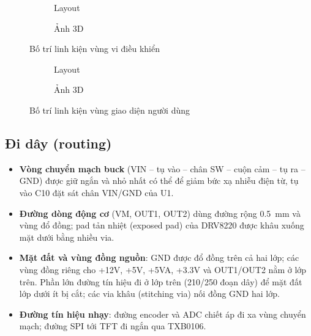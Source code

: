 \begin{figure}[H]
\centering
\begin{subfigure}{0.49\linewidth}\centering{}\caption{Layout}\end{subfigure}
\hfill
\begin{subfigure}{0.49\linewidth}\centering{}\caption{Ảnh 3D}\end{subfigure}
\caption{Bố trí linh kiện vùng vi điều khiển}
\label{fig:place_mcu}
\end{figure}

\begin{figure}[H]
\centering
\begin{subfigure}{0.65\linewidth}\centering{}\caption{Layout}\end{subfigure}

\vspace{0.5em}
\begin{subfigure}{0.65\linewidth}\centering{}\caption{Ảnh 3D}\end{subfigure}
\caption{Bố trí linh kiện vùng giao diện người dùng}
\label{fig:place_ui}
\end{figure}

\subsection{Đi dây (routing)}
\begin{itemize}
  \item \textbf{Vòng chuyển mạch buck} (VIN -- tụ vào -- chân SW -- cuộn cảm -- tụ ra -- GND) được giữ ngắn và nhỏ nhất có thể để giảm bức xạ nhiễu điện từ, tụ vào C10 đặt sát chân VIN/GND của U1.
  \item \textbf{Đường dòng động cơ} (VM, OUT1, OUT2) dùng đường rộng \SI{0.5}{\milli\metre} và vùng đổ đồng; pad tản nhiệt (exposed pad) của DRV8220 được khâu xuống mặt dưới bằng nhiều via.
  \item \textbf{Mặt đất và vùng đồng nguồn}: GND được đổ đồng trên cả hai lớp; các vùng đồng riêng cho +12V, +5V, +5VA, +3.3V và OUT1/OUT2 nằm ở lớp trên. Phần lớn đường tín hiệu đi ở lớp trên (210/250 đoạn dây) để mặt đất lớp dưới ít bị cắt; các via khâu (stitching via) nối đồng GND hai lớp.
  \item \textbf{Đường tín hiệu nhạy}: đường encoder và ADC chiết áp đi xa vùng chuyển mạch; đường SPI tới TFT đi ngắn qua TXB0106.
\end{itemize}

